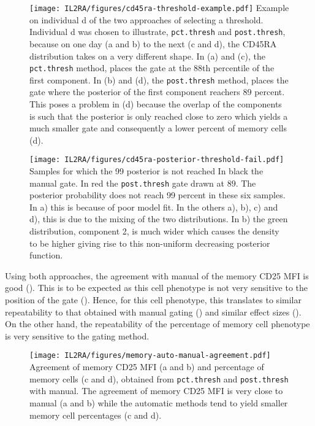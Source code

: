 \begin{figure}[h]
\centering
  \texttt{[image: IL2RA/figures/cd45ra-threshold-example.pdf]}
{ Example on individual d of the two approaches of selecting a threshold. }
{
  Individual d was chosen to illustrate, \texttt{pct.thresh} and \texttt{post.thresh}, because on one day (a and b) to the next (c and d), 
  the CD45RA distribution takes on a very different shape.
  In (a) and (c), the \texttt{pct.thresh} method, places the gate at the 88th percentile of the first component.
  In (b) and (d), the \texttt{post.thresh} method, places the gate where the posterior of the first component reachers 89 percent.
  This poses a problem in (d) because the overlap of the components is such that the posterior is only reached close to zero
  which yields a much smaller gate and consequently a lower percent of memory cells (d).
}
\end{figure}

\begin{figure}[h]
\centering
  \texttt{[image: IL2RA/figures/cd45ra-posterior-threshold-fail.pdf]}
{Samples for which the 99 posterior is not reached}
{
  In black the manual gate.  In red the \texttt{post.thresh} gate drawn at $89$.
  The posterior probability does not reach 99 percent in these six samples.
  In a) this is because of poor model fit.
  In the others a), b), c) and d), this is due to the mixing of the two distributions.
  In b) the green distribution, component 2, is much wider which causes the density to be higher giving
  rise to this non-uniform decreasing posterior function.
}
\end{figure}


Using both approaches, the agreement with manual of the memory CD25 MFI is good ().
This is to be expected as this cell phenotype is not very sensitive to the position of the  gate
().  
Hence, for this cell phenotype, this translates to similar repeatability to that obtained with manual gating () and similar effect sizes ().
On the other hand, the repeatability of the percentage of memory cell phenotype is very sensitive to the gating method.

\begin{figure}[h]
 \centering
 \texttt{[image: IL2RA/figures/memory-auto-manual-agreement.pdf]}
 {Agreement of memory CD25 MFI (a and b) and percentage of memory cells (c and d), obtained from \texttt{pct.thresh} and \texttt{post.thresh} with manual.}
 {
   The agreement of memory CD25 MFI is very close to manual (a and b) while the automatic methods tend to yield smaller memory cell percentages (c and d).
 }
\end{figure} 

